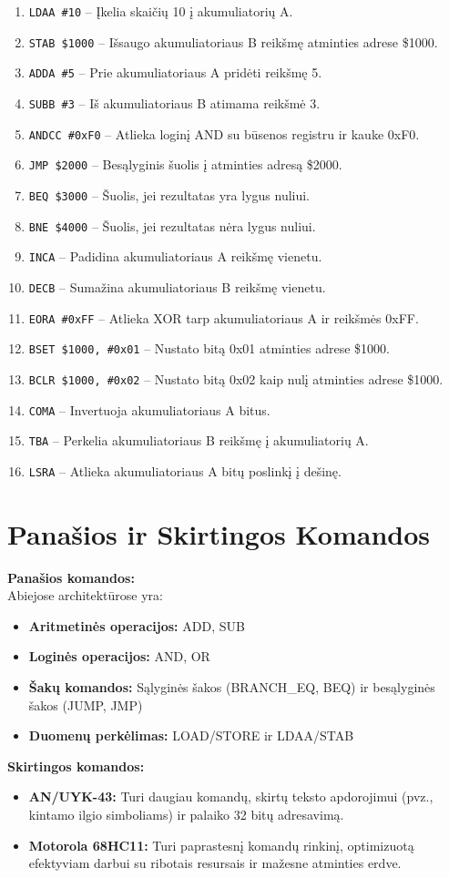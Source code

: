 \documentclass[a4paper,12pt]{article}
\begin{document}
\begin{enumerate}
    \item \texttt{LDAA \#10} – Įkelia skaičių 10 į akumuliatorių A.
    \item \texttt{STAB \$1000} – Išsaugo akumuliatoriaus B reikšmę atminties adrese \$1000.
    \item \texttt{ADDA \#5} – Prie akumuliatoriaus A pridėti reikšmę 5.
    \item \texttt{SUBB \#3} – Iš akumuliatoriaus B atimama reikšmė 3.
    \item \texttt{ANDCC \#0xF0} – Atlieka loginį AND su būsenos registru ir kauke 0xF0.
    \item \texttt{JMP \$2000} – Besąlyginis šuolis į atminties adresą \$2000.
    \item \texttt{BEQ \$3000} – Šuolis, jei rezultatas yra lygus nuliui.
    \item \texttt{BNE \$4000} – Šuolis, jei rezultatas nėra lygus nuliui.
    \item \texttt{INCA} – Padidina akumuliatoriaus A reikšmę vienetu.
    \item \texttt{DECB} – Sumažina akumuliatoriaus B reikšmę vienetu.
    \item \texttt{EORA \#0xFF} – Atlieka XOR tarp akumuliatoriaus A ir reikšmės 0xFF.
    \item \texttt{BSET \$1000, \#0x01} – Nustato bitą 0x01 atminties adrese \$1000.
    \item \texttt{BCLR \$1000, \#0x02} – Nustato bitą 0x02 kaip nulį atminties adrese \$1000.
    \item \texttt{COMA} – Invertuoja akumuliatoriaus A bitus.
    \item \texttt{TBA} – Perkelia akumuliatoriaus B reikšmę į akumuliatorių A.
    \item \texttt{LSRA} – Atlieka akumuliatoriaus A bitų poslinkį į dešinę.
\end{enumerate}
\section*{Panašios ir Skirtingos Komandos}
\textbf{Panašios komandos:} \\
Abiejose architektūrose yra: 
\begin{itemize}
    \item \textbf{Aritmetinės operacijos:} ADD, SUB
    \item \textbf{Loginės operacijos:} AND, OR
    \item \textbf{Šakų komandos:} Sąlyginės šakos (BRANCH\_EQ, BEQ) ir besąlyginės šakos (JUMP, JMP)
    \item \textbf{Duomenų perkėlimas:} LOAD/STORE ir LDAA/STAB
\end{itemize}
\textbf{Skirtingos komandos:}
\begin{itemize}
    \item \textbf{AN/UYK-43:} Turi daugiau komandų, skirtų teksto apdorojimui (pvz., kintamo ilgio simboliams) ir palaiko 32 bitų adresavimą.
    \item \textbf{Motorola 68HC11:} Turi paprastesnį komandų rinkinį, optimizuotą efektyviam darbui su ribotais resursais ir mažesne atminties erdve.
\end{itemize}
\end{document}
